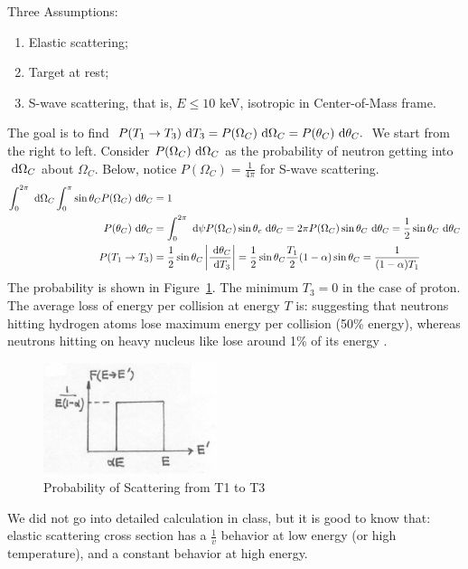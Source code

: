 \documentclass{school-22.101-notes}
\begin{document}
Three Assumptions:
\begin{enumerate}
\item Elastic scattering;
\item Target at rest;
\item S-wave scattering, that is, $E \le 10$ keV, isotropic in Center-of-Mass frame.
\end{enumerate}
The goal is to find $P(T_1 \to T_3) \mbox{ }\mathrm{d} T_3 = P(\Omega_C) \mbox{ }\mathrm{d} \Omega_C = P(\theta_C) \mbox{ }\mathrm{d} \theta_C.$ We start from the right to left. Consider $P(\Omega_C) \mbox{ }\mathrm{d} \Omega_C$ as the probability of neutron getting into $\mbox{ }\mathrm{d} \Omega_C$ about $\Omega_C$. Below, notice $P(\Omega_C) = \frac{1}{4 \pi}$ for S-wave scattering. 
\begin{align}
\int_0^{2 \pi} \mbox{ }\mathrm{d} \Omega_C \int_0^{\pi} \sin \theta_C P(\Omega_C) \mbox{ }\mathrm{d} \theta_C  &= 1 \\
P(\theta_C) \mbox{ }\mathrm{d} \theta_C &= \int_0^{2\pi} \mbox{ }\mathrm{d} \psi P(\Omega_C) \sin \theta_c \mbox{ }\mathrm{d} \theta_C = 2 \pi P(\Omega_C) \sin \theta_C \mbox{ }\mathrm{d} \theta_C  = \frac{1}{2} \sin \theta_C \mbox{ }\mathrm{d} \theta_C \\
P(T_1 \to T_3) &= \frac{1}{2} \sin \theta_C \left| \frac{\mbox{ }\mathrm{d} \theta_C}{\mbox{ }\mathrm{d} T_3} \right| = \frac{1}{2} \sin \theta_C \frac{T_1}{2} (1-\alpha) \sin \theta_C = \frac{1}{(1-\alpha) T_1}  
\end{align}
The probability is shown in Figure~\ref{PT1toT3}. The minimum $T_3 =0 $ in the case of proton. The average loss of energy per collision at energy $T$ is:
suggesting that neutrons hitting hydrogen atoms lose maximum energy per collision (50\% energy), whereas neutrons hitting on heavy nucleus like  lose around 1\% of its energy . 
\begin{figure}
    \centering
    \includegraphics[width=2in]{images/ni/PT1toT3.png}
    \caption{Probability of Scattering from T1 to T3\label{PT1toT3}}
\end{figure}

We did not go into detailed calculation in class, but it is good to know that: elastic scattering cross section has a $\frac{1}{v}$ behavior at low energy (or high temperature), and a constant behavior at high energy. 
\end{document}
